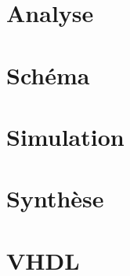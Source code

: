 \documentclass[10pt,a4paper]{article}
\begin{document}
\section{Analyse}

\section{Schéma}

\section{Simulation}

\section{Synthèse}

\section{VHDL}
\end{document}
